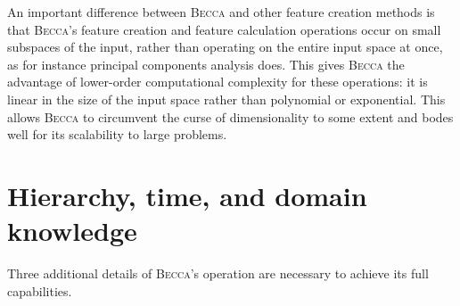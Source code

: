 An important difference between \textsc{Becca} and other feature creation methods is that \textsc{Becca}'s feature creation and feature calculation operations occur on small subspaces of the input, rather than operating on the entire input space at once, as for instance principal components analysis does. This gives \textsc{Becca} the advantage of lower-order computational complexity for these operations: it is linear in the size of the input space rather than polynomial or exponential. This allows \textsc{Becca} to circumvent the curse of dimensionality to some extent and bodes well for its scalability to large problems. 

\section{Hierarchy, time, and domain knowledge} 

Three additional details of \textsc{Becca}'s operation are necessary to achieve its full capabilities. 

